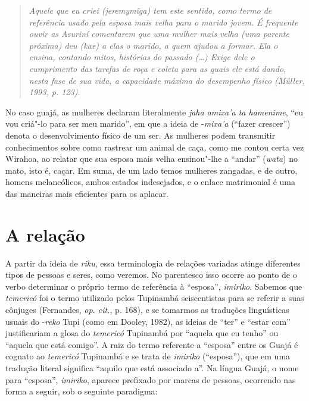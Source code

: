 \begin{quote}
\emph{Aquele que eu criei (\emph{jeremymĩga}) tem este sentido, como termo de
referência usado pela esposa mais velha para o marido jovem. É frequente
ouvir as Asuriní comentarem que uma mulher mais velha (uma parente
próxima) deu (\emph{kae}) a elas o marido, a quem ajudou a formar. Ela o
ensina, contando mitos, histórias do passado (\ldots{}) Exige dele o
cumprimento das tarefas de roça e coleta para as quais ele está dando,
nesta fase de sua vida, a capacidade máxima do desempenho físico (Müller,
1993, p. 123).}
\end{quote}

No caso guajá, as mulheres declaram literalmente \emph{jaha amixa'a ta
hamenime}, ``eu vou criá"-lo para ser meu marido'', em que a ideia de
-\emph{mixa'a} (``fazer crescer'') denota o desenvolvimento físico de um
ser. As mulheres podem transmitir conhecimentos sobre como rastrear um
animal de caça, como me contou certa vez Wirahoa, ao relatar que sua
esposa mais velha ensinou"-lhe a ``andar'' (\emph{wata}) no mato, isto é,
caçar. Em suma, de um lado temos mulheres zangadas, e de outro, homens
melancólicos, ambos estados indesejados, e o enlace matrimonial é uma
das maneiras mais eficientes para os aplacar.

\section{A relação}\label{a-relauxe7uxe3o}

A partir da ideia de \emph{riku}, essa terminologia de relações variadas
atinge diferentes tipos de pessoas e seres, como veremos. No parentesco
isso ocorre ao ponto de o verbo determinar o próprio termo de referência
à ``esposa'', \emph{imiriko}. Sabemos que \emph{temericó} foi o termo
utilizado pelos Tupinambá seiscentistas para se referir a suas cônjuges
(Fernandes, \emph{op. cit.}, p. 168), e se tomarmos as traduções linguísticas
usuais do -\emph{reko} Tupi (como em Dooley, 1982), as ideias de ``ter'' e
``estar com'' justificariam a glosa do \emph{temericó} Tupinambá por
``aquela que eu tenho'' ou ``aquela que está comigo''. A raiz do termo
referente a ``esposa'' entre os Guajá é cognato ao \emph{temericó}
Tupinambá e se trata de \emph{imiriko} (``esposa''), que em uma tradução
literal significa ``aquilo que está associado a''. Na língua Guajá, o nome
para ``esposa'', \emph{imiriko}, aparece prefixado por marcas de pessoas,
ocorrendo nas forma a seguir, sob o seguinte paradigma:

